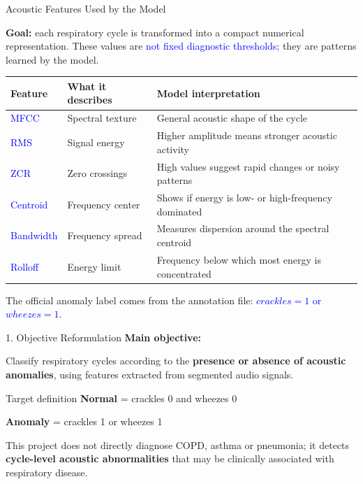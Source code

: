 \documentclass[aspectratio=169]{beamer}
\newcommand{\important}[1]{\textcolor{YachayBlue}{\textbf{#1}}}
\begin{document}
\begin{frame}{Acoustic Features Used by the Model}
\small

\textbf{Goal:} each respiratory cycle is transformed into a compact numerical representation. 
These values are \textcolor{blue}{not fixed diagnostic thresholds}; they are patterns learned by the model.

\vspace{0.25cm}

\begin{table}
\centering
\renewcommand{\arraystretch}{1.25}
\begin{tabular}{p{2.6cm} p{4.0cm} p{4.1cm}}
\hline
\textbf{Feature} & \textbf{What it describes} & \textbf{Model interpretation} \\
\hline
\textcolor{blue}{MFCC} & Spectral texture & General acoustic shape of the cycle \\
\textcolor{blue}{RMS} & Signal energy & Higher amplitude means stronger acoustic activity \\
\textcolor{blue}{ZCR} & Zero crossings & High values suggest rapid changes or noisy patterns \\
\textcolor{blue}{Centroid} & Frequency center & Shows if energy is low- or high-frequency dominated \\
\textcolor{blue}{Bandwidth} & Frequency spread & Measures dispersion around the spectral centroid \\
\textcolor{blue}{Rolloff} & Energy limit & Frequency below which most energy is concentrated \\
\hline
\end{tabular}
\end{table}

\vspace{0.15cm}

\footnotesize
The official anomaly label comes from the annotation file: 
\textcolor{blue}{$crackles=1$ or $wheezes=1$}.

\end{frame}
\begin{frame}{1. Objective Reformulation}
\textbf{Main objective:}

\vspace{0.3cm}
Classify respiratory cycles according to the \important{presence or absence of acoustic anomalies}, using features extracted from segmented audio signals.

\vspace{0.4cm}
\begin{block}{Target definition}
\centering
\important{Normal} = crackles 0 and wheezes 0

\important{Anomaly} = crackles 1 or wheezes 1
\end{block}

\vspace{0.25cm}
This project does not directly diagnose COPD, asthma or pneumonia; it detects \important{cycle-level acoustic abnormalities} that may be clinically associated with respiratory disease.
\end{frame}
\end{document}

